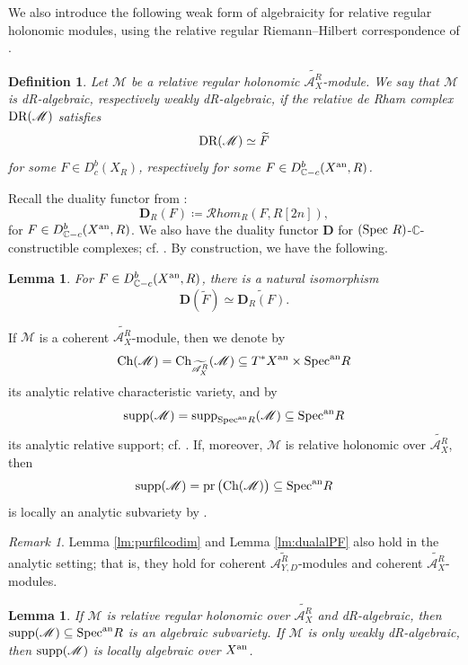 \documentclass{amsart}
\theoremstyle{plain}
\numberwithin{theorem}{section}
\newtheorem{lemma}[theorem]{Lemma}
\newtheorem{definition}[theorem]{Definition}
\theoremstyle{definition}
\theoremstyle{remark}
\newtheorem{remark}[theorem]{Remark}
\theoremstyle{definition}
\newcommand{\wt}{\widetilde}
\newcommand{\C}{\mathbb{C}} %
\newcommand{\sM}{\mathscr{M}}
\newcommand{\sA}{\mathscr{A}}
\newcommand{\Spec}{\textup{Spec }}
\newcommand{\Specan}{\textup{Spec}^{\textup{an}}}
\newcommand{\DR}{\textup{DR}}
\newcommand{\an}{\textup{an}}
\newcommand{\supp}{\textup{supp}}
\newcommand{\Ch}{\textup{Ch}}
\newcommand{\cRhom}{\mathcal Rhom}
\begin{document}
We also introduce the following weak form of algebraicity for relative
regular holonomic modules, using the relative regular Riemann--Hilbert
correspondence of \cite{FFS23}.

\begin{definition}\label{def:dralgebraic}
Let $\sM$ be a relative regular holonomic $\wt{\sA_X^R}$-module. We say that
$\sM$ is \emph{dR-algebraic}, respectively \emph{weakly dR-algebraic}, if
the relative de Rham complex $\DR(\sM)$ satisfies
\[
\DR(\sM)\simeq \wt F
\]
for some $F\in D^b_c(X_R)$, respectively for some
$F\in D^b_{\C-c}(X^\an,R)$.
\end{definition}

Recall the duality functor from \cite{KSbook}:
\[
\mathbf D_R(F)
\coloneqq
\cRhom_R(F,R[2n]),
\]
for $F\in D^b_{\C-c}(X^\an,R)$. We also have the duality functor
$\mathbf D$ for $(\Spec R)$-$\C$-constructible complexes; cf.
\cite[\S 2.6]{FS13}. By construction, we have the following.

\begin{lemma}\label{lm:twistdual}
For $F\in D^b_{\C-c}(X^\an,R)$, there is a natural isomorphism
\[
\mathbf D(\wt F)\simeq \wt{\mathbf D_R(F)}.
\]
\end{lemma}

If $\sM$ is a coherent $\wt{\sA_X^R}$-module, then we denote by
\[
\Ch(\sM)
=
\Ch_{\wt{\sA_X^R}}(\sM)
\subseteq
T^*X^\an\times \Specan R
\]
its analytic relative characteristic variety, and by
\[
\supp(\sM)
=
\supp_{\Specan R}(\sM)
\subseteq
\Specan R
\]
its analytic relative support; cf. \cite[Prop.-Def.5.7]{WuRHA}. If,
moreover, $\sM$ is relative holonomic over $\wt{\sA_X^R}$, then
\[
\supp(\sM)
=
\operatorname{pr}\big(\Ch(\sM)\big)
\subseteq
\Specan R
\]
is locally an analytic subvariety by \cite[Cor.5.10]{WuRHA}.

\begin{remark}\label{rmk:analyticpurefil}
Lemma \ref{lm:purfilcodim} and Lemma \ref{lm:dualalPF} also hold in the
analytic setting; that is, they hold for coherent $\wt{\sA_{Y,D}^R}$-modules
and coherent $\wt{\sA_X^R}$-modules.
\end{remark}

\begin{lemma}\label{lm:dralg}
If $\sM$ is relative regular holonomic over $\wt{\sA_X^R}$ and
dR-algebraic, then $\supp(\sM)\subseteq \Specan R$ is an algebraic
subvariety. If $\sM$ is only weakly dR-algebraic, then $\supp(\sM)$ is
locally algebraic over $X^\an$.
\end{lemma}
\end{document}
